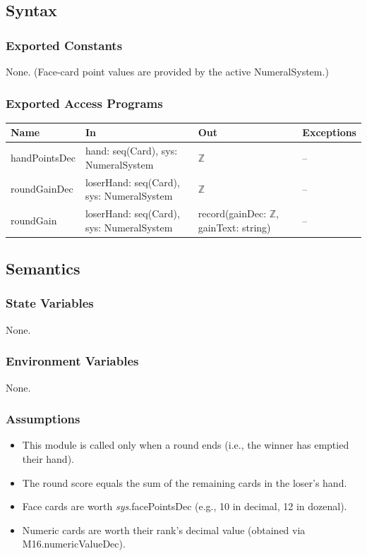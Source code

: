 \documentclass[12pt, titlepage]{article}
\begin{document}
\subsection{Syntax}

\subsubsection{Exported Constants}
None. (Face-card point values are provided by the active NumeralSystem.)

\subsubsection{Exported Access Programs}

\begin{center}
\begin{tabular}{p{3.5cm} p{5cm} p{3.5cm} p{3cm}}
\toprule
\textbf{Name} & \textbf{In} & \textbf{Out} & \textbf{Exceptions} \\
\midrule
handPointsDec & hand: seq(Card), sys: NumeralSystem & $\mathbb{Z}$ & -- \\
roundGainDec & loserHand: seq(Card), sys: NumeralSystem & $\mathbb{Z}$ & -- \\
roundGain & loserHand: seq(Card), sys: NumeralSystem & record(gainDec: $\mathbb{Z}$, gainText: string) & -- \\
\bottomrule
\end{tabular}
\end{center}

\subsection{Semantics}

\subsubsection{State Variables}
None.

\subsubsection{Environment Variables}
None.

\subsubsection{Assumptions}
\begin{itemize}
    \item This module is called only when a round ends (i.e., the winner has emptied their hand).
    \item The round score equals the sum of the remaining cards in the loser's hand.
    \item Face cards are worth \textit{sys}.facePointsDec (e.g., 10 in decimal, 12 in dozenal).
    \item Numeric cards are worth their rank's decimal value (obtained via M16.numericValueDec).
\end{itemize}
\end{document}
